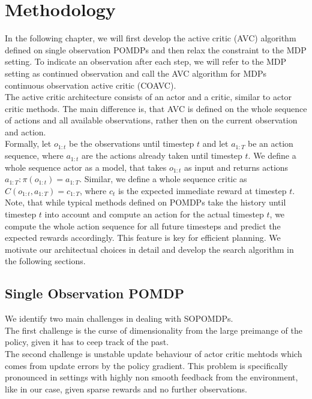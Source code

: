 
\chapter{Methodology}
\label{chapter:Methodology}
In the following chapter, we will first develop the active critic (AVC) algorithm defined on single observation POMDPs and then relax 
the constraint to the MDP setting. To indicate an observation after each step, we will refer to the MDP setting as continued observation 
and call the AVC algorithm for MDPs continuous observation active critic (COAVC).\\

The active critic architecture consists of an actor and a critic, similar to actor critic methods. The main difference is, that AVC is defined on the whole sequence of 
actions and all available observations, rather then on the current observation and action.\\ 

Formally, let $o_{1:t}$ be the observations until timestep $t$ and let $a_{1:T}$ be an action sequence, where $a_{1:t}$ are the actions already taken until timestep $t$. 
We define a whole sequence actor as a model, that takes $o_{1:t}$ as input and returns actions $a_{1:T}: \pi(o_{1:t}) = a_{1:T}$. Similar, we define a whole sequence critic 
as $C(o_{1:t}, a_{1:T}) = c_{1:T}$, where $c_t$ is the expected immediate reward at timestep $t$. Note, that while typical methods defined on POMDPs take the history until 
timestep $t$ into account and compute an action for the actual timestep $t$, we compute the whole action sequence for all future timesteps and predict the expected rewards 
accordingly. This feature is key for efficient planning. We motivate our architectual choices in detail and develop the search algorithm in the following sections.


\section{Single Observation POMDP}
We identify two main challenges in dealing with SOPOMDPs. \\
The first challenge is the curse of dimensionality from the large preimange of the policy, given it has to ceep track 
of the past. \\
The second challenge is unstable update behaviour of actor critic mehtods which comes from update errors by the policy gradient. This problem 
is specifically pronounced in settings with highly non smooth feedback from the environment, like in our case, given sparse rewards 
and no further observations.
